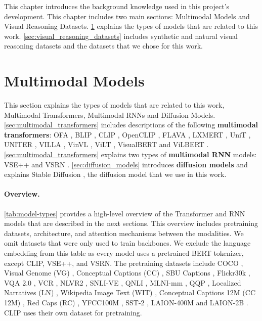This chapter introduces the background knowledge used in this project's development. This chapter includes two main sections: Multimodal Models and Visual Reasoning Datasets. \cref{sec:multimodal_models} explains the types of models that are related to this work. \cref{sec:visual_reasoning_datasets} includes synthetic and natural visual reasoning datasets and the datasets that we chose for this work.

\section{Multimodal Models} \label{sec:multimodal_models}

This section explains the types of models that are related to this work, Multimodal Transformers, Multimodal RNNs and Diffusion Models. \cref{sec:multimodal_transformers} includes descriptions of the following \textbf{multimodal transformers}: OFA \cite{wang2022unifying}, BLIP \cite{li2022blip}, CLIP \cite{radford2021clip}, OpenCLIP \cite{ilharco_gabriel_2021_5143773}, FLAVA \cite{singh2022flava}, LXMERT \cite{tan2020lxmert}, UniT \cite{hu2021unit}, UNITER \cite{chen2020uniter}, VILLA \cite{gan2020villa}, VinVL \cite{zhang2021vinvl}, ViLT \cite{kim2021vilt}, VisualBERT \cite{li2019visualbert} and ViLBERT \cite{lu2019vilbert}. \cref{sec:multimodal_transformers} explains two types of \textbf{multimodal RNN} models: VSE++ \cite{faghri2018vse} and VSRN \cite{li2019vsrn}. \cref{sec:diffusion_models} introduces \textbf{diffusion models} and explains Stable Diffusion \cite{rombach2021highresolution}, the diffusion model that we use in this work.

\paragraph{Overview.}
\cref{tab:model-types} provides a high-level overview of the Transformer and RNN models that are described in the next sections. This overview includes pretraining datasets, architecture, and attention mechanisms between the modalities. We omit datasets that were only used to train backbones. We exclude the language embedding from this table as every model uses a pretrained BERT tokenizer, except CLIP, VSE++, and VSRN. The pretraining datasets include COCO \cite{lin2014microsoft}, Visual Genome (VG) \cite{krishna2016visual}, Conceptual Captions (CC) \cite{sharma2018conceptual}, SBU Captions \cite{ordonez2011im2text}, Flickr30k \cite{young2014image}, VQA 2.0 \cite{goyal2017making}, VCR \cite{zellers2019recognition}, NLVR2 \cite{suhr2017corpus}, SNLI-VE \cite{xie2018visual}, QNLI \cite{rajpurkar2016squad}, MLNI-mm \cite{williams2017broad}, QQP \cite{QQPDataset}, Localized Narratives (LN) \cite{pont-tuset2020localized-narratives}, Wikipedia Image Text (WIT) \cite{srinivasan2021wit}, Conceptual Captions 12M (CC 12M) \cite{changpinyo2021conceptual12m}, Red Caps (RC) \cite{desai2021redcaps}, YFCC100M \cite{thomee2016yfcc100m}, SST-2 \cite{Socher2013RecursiveDM}, LAION-400M \cite{schuhmann2021laion} and LAION-2B \cite{schuhmann2022laionb}. CLIP uses their own dataset for pretraining.

